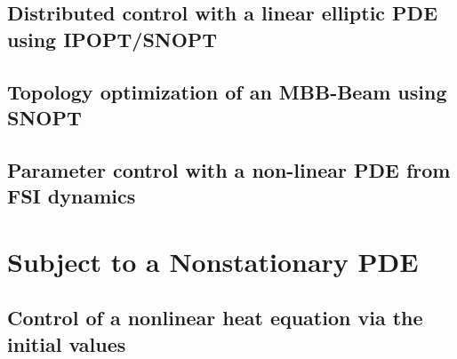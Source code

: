 \documentclass[a4paper,cleardoubleempty]{scrreprt}
\theoremstyle{plain}
\theoremstyle{remark}
\begin{document}
\subsection{Distributed control with a linear elliptic PDE using IPOPT/SNOPT}
\label{OPT_Stat_Box_controlconstraints_SNOPT}

\clearpage
\subsection{Topology optimization of an MBB-Beam using SNOPT}
\label{OPT_Stat_TopOpt_MBB_SNOPT}

\clearpage
\subsection{Parameter control with a non-linear PDE from FSI dynamics}
\label{OPT_Stat_Param_Nonlin_FSI}

\clearpage
\section{Subject to a Nonstationary PDE}
\label{OPT_Instat}
\subsection{Control of a nonlinear heat equation via the initial values}
\label{OPT_Instat initial-value end-time}

\clearpage










\printindex

\end{document}
